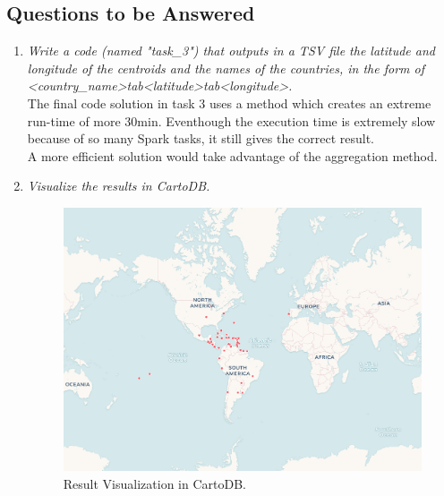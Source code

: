 \documentclass{article}
\begin{document}
\subsection*{Questions to be Answered}
\begin{enumerate}[label=\alph*)]
    \item \textit{Write a code (named "task\_3") that outputs in a TSV file the latitude and longitude of the centroids and the names of the countries, in the form of \textless country\_name\textgreater tab\textless latitude\textgreater tab\textless longitude\textgreater .}\\
    
    The final code solution in task 3 uses a method which creates an extreme run-time of more 30min. Eventhough the execution time is extremely slow because of so many Spark tasks, it still gives the correct result.\\
    
    A more efficient solution would take advantage of the aggregation method.\\
    
    \item \textit{Visualize the results in CartoDB.}\\
    
    \begin{figure}[H]
        \centering
        \includegraphics[width=\textwidth]{PhaseOne/docs/img/cartodb-visualization.png}
        \caption{Result Visualization in CartoDB.}
        \label{fig:cartodb}
    \end{figure}
    
\end{enumerate}
\end{document}
